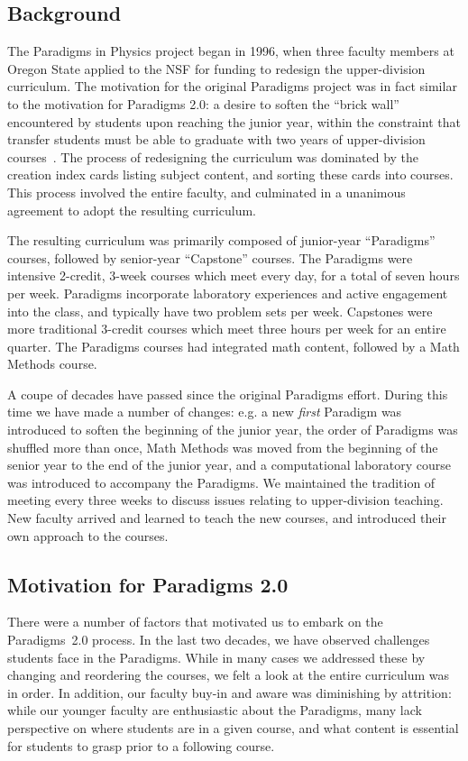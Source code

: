 \documentclass[english,aps,pra,reprint,noshowpacs,superscriptaddress]{revtex4-1}
\begin{document}
\subsection{Background}
The Paradigms in Physics project began in 1996, when three faculty
members at Oregon State applied to the NSF for funding to redesign the
upper-division curriculum.  The motivation for the original Paradigms
project was in fact similar to the motivation for Paradigms 2.0: a
desire to soften the ``brick wall'' encountered by students upon
reaching the junior year, within the constraint that transfer students
must be able to graduate with two years of upper-division
courses~\cite{manogue2001paradigms}.  The process of redesigning the
curriculum was dominated by the creation index cards listing subject
content, and sorting these cards into courses.  This process involved
the entire faculty, and culminated in a unanimous agreement to adopt
the resulting curriculum.

The resulting curriculum was primarily composed of junior-year
``Paradigms'' courses, followed by senior-year ``Capstone'' courses.
The Paradigms were intensive 2-credit, 3-week courses which meet every
day, for a total of seven hours per week.  Paradigms incorporate
laboratory experiences and active engagement into the class, and
typically have two problem sets per week.  Capstones were more
traditional 3-credit courses which meet three hours per week for an
entire quarter.  The Paradigms courses had integrated math content,
followed by a Math Methods course.

A coupe of decades have passed since the original Paradigms effort.
During this time we have made a number of changes: e.g. a new
\emph{first} Paradigm was introduced to soften the beginning of the
junior year, the order of Paradigms was shuffled more than once, Math
Methods was moved from the beginning of the senior year to the end of
the junior year, and a computational laboratory course was introduced
to accompany the Paradigms.  We maintained the tradition of meeting
every three weeks to discuss issues relating to upper-division
teaching.  New faculty arrived and learned to teach the new courses,
and introduced their own approach to the courses.

\subsection{Motivation for Paradigms 2.0}
There were a number of factors that motivated us to embark on the
Paradigms~2.0 process.  In the last two decades, we have observed
challenges students face in the Paradigms.  While in many cases we
addressed these by changing and reordering the courses, we felt a look
at the entire curriculum was in order.  In addition, our faculty
buy-in and aware was diminishing by attrition: while our younger
faculty are enthusiastic about the Paradigms, many lack perspective on
where students are in a given course, and what content is essential
for students to grasp prior to a following course.
\end{document}

